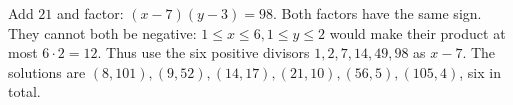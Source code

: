 Add $21$ and factor: $(x-7)(y-3)=98$. Both factors have the same sign. They cannot both be negative: $1\le x\le6,1\le y\le2$ would make their product at most $6\cdot2=12$. Thus use the six positive divisors $1,2,7,14,49,98$ as $x-7$. The solutions are $\boxed{(8,101),(9,52),(14,17),(21,10),(56,5),(105,4)}$, six in total.
